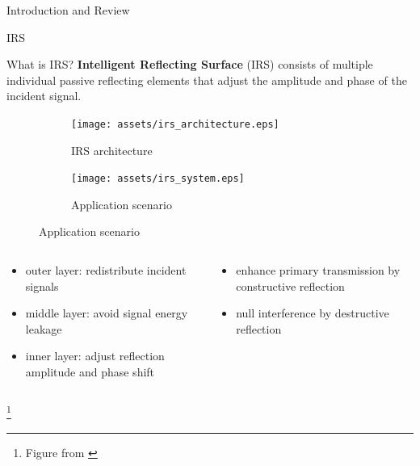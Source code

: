 \documentclass[9pt]{beamer}
\newcommand\blfootnote[1]{%
\begingroup
\renewcommand\thefootnote{}\footnote{#1}%
\addtocounter{footnote}{-1}%
\endgroup
}
\begin{document}
\begin{section}{Introduction and Review}
	\begin{subsection}{IRS}
		\begin{frame}{What is IRS?}
			\textbf{Intelligent Reflecting Surface} (IRS) consists of multiple individual passive reflecting elements that adjust the amplitude and phase of the incident signal.
			\begin{figure}
				\centering
				\begin{subfigure}{.48\textwidth}
					\centering
					\texttt{[image: assets/irs\_architecture.eps]}
					\caption{IRS architecture}
				\end{subfigure}
				\begin{subfigure}{.48\textwidth}
					\centering
					\texttt{[image: assets/irs\_system.eps]}
					\caption{Application scenario}
				\end{subfigure}
			\end{figure}
			\begin{columns}
				\begin{column}{0.5\textwidth}
					\begin{itemize}
						\item outer layer: redistribute incident signals
						\item middle layer: avoid signal energy leakage
						\item inner layer: adjust reflection amplitude and phase shift
					\end{itemize}
				\end{column}
				\begin{column}{0.5\textwidth}
					\begin{itemize}
						\item enhance primary transmission by constructive reflection
						\item null interference by destructive reflection
					\end{itemize}
				\end{column}
			\end{columns}
			\blfootnote{Figure from \cite{Wu2019,Wu2020}}
		\end{frame}


\end{subsection}
\end{section}
\end{document}

